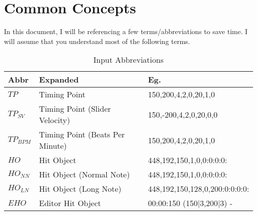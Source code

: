 \part{Common Concepts}

In this document, I will be referencing a few terms/abbreviations to save time. I will assume that you understand most of the following terms.

\begin{table}[ht]
  \begin{center}
    \caption{Input Abbreviations}
    \label{tab:tbl_abbr}
    \begin{tabular}{l|l|l}
    
		\textbf{Abbr} & \textbf{Expanded} & \textbf{Eg.}\\
		\hline
		$ TP $      & Timing Point                    & 150,200,4,2,0,20,1,0\\
		$ TP_{SV} $ & Timing Point (Slider Velocity)  & 150,-200,4,2,0,20,0,0\\
		$ TP_{BPM} $& Timing Point (Beats Per Minute) & 150,200,4,2,0,20,1,0\\
		\hline
		$ HO $      & Hit Object                      & 448,192,150,1,0,0:0:0:0:\\
		$ HO_{NN} $ & Hit Object (Normal Note)        & 448,192,150,1,0,0:0:0:0:\\
		$ HO_{LN} $ & Hit Object (Long Note)          & 448,192,150,128,0,200:0:0:0:0:\\
		$ EHO $     & Editor Hit Object               & 00:00:150 (150$|$3,200$|$3) - \\
		\end{tabular}
	\end{center}
\end{table}

